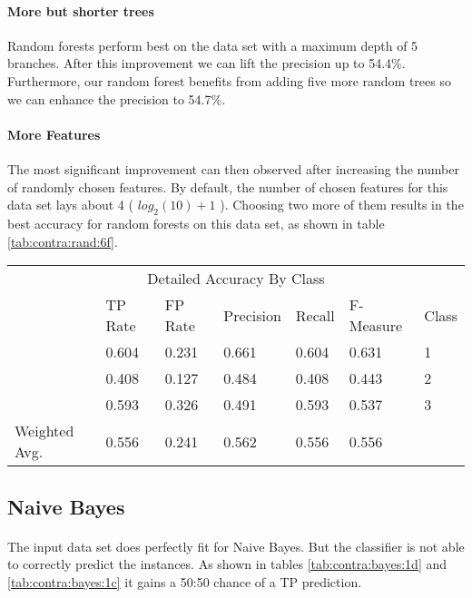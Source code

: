 \documentclass[paper=a4, fontsize=11pt]{scrartcl} %
\numberwithin{equation}{section} %
\numberwithin{figure}{section} %
\numberwithin{table}{section} %
\begin{document}
\paragraph{More but shorter trees}
Random forests perform best on the data set with a maximum depth of 5 branches. After this improvement we can lift the precision up to 54.4\%. Furthermore, our random forest benefits from adding five more random trees so we can enhance the precision to  54.7\%.
\paragraph{More Features}
The most significant improvement can then observed after increasing the number of randomly chosen features. By default, the number of chosen features for this data set lays about 4 ( $ log_2(10) + 1 $ ). Choosing two more of them results in the best accuracy for random forests on this data set, as shown in table \ref{tab:contra:rand:6f}.

\begin{table*}[htb]\centering
  \begin{tabular*}{\columnwidth}{@{}lllllll@{}}
      \toprule 
      \multicolumn{7}{c}{Detailed Accuracy By Class} \\ 
               &  TP Rate & FP Rate & Precision & Recall & F-Measure &  Class \\  \midrule     
               &  0.604   & 0.231   & 0.661     & 0.604  & 0.631     &  1     \\  
               &  0.408   & 0.127   & 0.484     & 0.408  & 0.443     &  2     \\  
               &  0.593   & 0.326   & 0.491     & 0.593  & 0.537     &  3     \\  
Weighted Avg.  &  0.556   & 0.241   & 0.562     & 0.556  & 0.556     &        \\  \bottomrule 
    \end{tabular*}
\caption{Random Forests on Contraceptive Data Set -- with at least 6 chosen features} 
\label{tab:contra:rand:6f}
\end{table*}
\FloatBarrier


\subsection{Naive Bayes}

\paragraph{}The input data set does perfectly fit for Naive Bayes. But the classifier is not able to correctly predict the instances. As shown in tables \ref{tab:contra:bayes:1d} and \ref{tab:contra:bayes:1c} it gains a 50:50 chance of a TP prediction.
\end{document}
